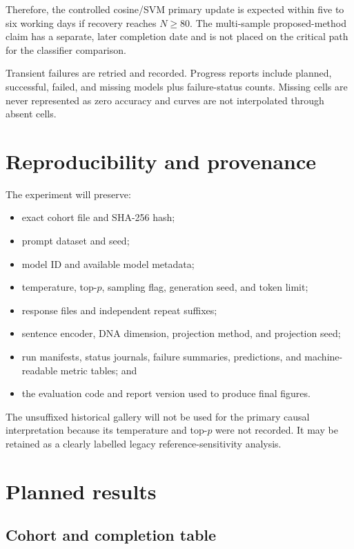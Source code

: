 \documentclass[11pt,a4paper]{article}
\begin{document}
Therefore, the controlled cosine/SVM primary update is expected within five to
six working days if recovery reaches $N\geq80$. The multi-sample proposed-method
claim has a separate, later completion date and is not placed on the critical
path for the classifier comparison.

Transient failures are retried and recorded. Progress reports include planned,
successful, failed, and missing models plus failure-status counts. Missing
cells are never represented as zero accuracy and curves are not interpolated
through absent cells.

\section{Reproducibility and provenance}

The experiment will preserve:

\begin{itemize}
  \item exact cohort file and SHA-256 hash;
  \item prompt dataset and seed;
  \item model ID and available model metadata;
  \item temperature, top-$p$, sampling flag, generation seed, and token limit;
  \item response files and independent repeat suffixes;
  \item sentence encoder, DNA dimension, projection method, and projection seed;
  \item run manifests, status journals, failure summaries, predictions, and
        machine-readable metric tables; and
  \item the evaluation code and report version used to produce final figures.
\end{itemize}

The unsuffixed historical gallery will not be used for the primary causal
interpretation because its temperature and top-$p$ were not recorded. It may be
retained as a clearly labelled legacy reference-sensitivity analysis.

\section{Planned results}

\subsection{Cohort and completion table}
\end{document}
